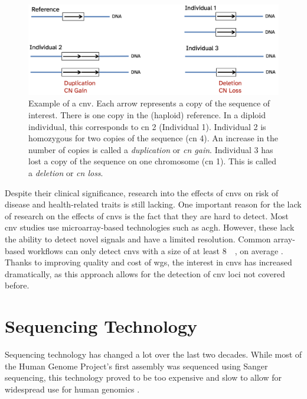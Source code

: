 \documentclass[draft, twoside=false]{scrbook}
\begin{document}
\begin{figure}
    \centering
    \includegraphics[width=\textwidth]{img/cnv_example.png}
    \caption{Example of a \gls{cnv}.
        Each arrow represents a copy of the sequence of interest.
        There is one copy in the (haploid) reference.
        In a diploid individual, this corresponds to \gls{cn} 2 (Individual 1).
        Individual 2 is homozygous for two copies of the sequence (\gls{cn} 4).
        An increase in the number of copies is called a \textit{duplication} or \textit{\gls{cn} gain}.
        Individual 3 has lost a copy of the sequence on one chromosome (\gls{cn} 1).
        This is called a \textit{deletion} or \textit{\gls{cn} loss}.}
        \label{fig:cnv}
\end{figure}

Despite their clinical significance, research into the effects of \glspl{cnv} on risk of disease and health-related traits is still lacking.
One important reason for the lack of research on the effects of \glspl{cnv} is the fact that they are hard to detect.
Most \gls{cnv} studies use microarray-based technologies such as \gls{acgh}.
However, these lack the ability to detect novel signals and have a limited resolution.
Common array-based workflows can only detect \glspl{cnv} with a size of at least \qty{8}{\kilo\base}, on average \cite{Quenez2020}.
Thanks to improving quality and cost of \gls{wgs}, the interest in \glspl{cnv} has increased dramatically, as this approach allows for the detection of \gls{cnv} loci not covered before.

\section{Sequencing Technology}
Sequencing technology has changed a lot over the last two decades.
While most of the Human Genome Project's first assembly was sequenced using Sanger sequencing, this technology proved to be too expensive and slow to allow for widespread use for human genomics \cite{Lander2001}.
\end{document}
